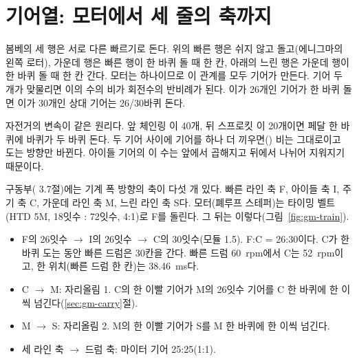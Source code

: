 \section{기어열: 모터에서 세 줄의 축까지}\label{sec:gm-train}

\Why 봄베의 세 행은 서로 다른 빠르기로 돈다. 위의 빠른 행은 쉬지 않고 돌고(에니그마의 왼쪽 로터), 가운데 행은 빠른
행이 한 바퀴 돌 때 한 칸, 아래의 느린 행은 가운데 행이 한 바퀴 돌 때 한 칸 간다. 모터는 하나이므로 이 관계를
모두 기어가 만든다. 기어 두 개가 맞물리면 이의 수의 비가 회전수의 반비례가 된다. 이가 26개인 기어가 한 바퀴 돌면
이가 30개인 상대 기어는 26/30바퀴 돈다.

\General 자전거의 변속이 같은 원리다. 앞 체인링 이 40개, 뒤 스프로킷 이 20개이면 페달 한 바퀴에 바퀴가 두 바퀴
돈다. 두 기어 사이에 기어를 하나 더 끼우면() 비는 그대로이고 도는 방향만 바뀐다.
아이들 기어의 이 수는 앞에서 곱해지고 뒤에서 나뉘어 지워지기 때문이다.

\Ours 구동부( 3.7절)에는 기계 폭 방향의 축이 다섯 개 있다. 빠른 라인 축 F, 아이들 축 I, 주기 축 C,
가운데 라인 축 M, 느린 라인 축 S다. 모터(폐루프 스테퍼)는 타이밍 벨트(HTD 5M, 18잇수 : 72잇수, 4:1)로 F를 돌린다.
그 뒤는 이렇다(그림~\ref{fig:gm-train}).

\begin{itemize}
\item F의 26잇수 $\to$ I의 26잇수 $\to$ C의 30잇수(모듈 1.5). F:C = 26:30이다. C가 한 바퀴 도는 동안 빠른 드럼은
30칸을 간다. 빠른 드럼 60~rpm에서 C는 52~rpm이고, 한 위치(빠른 드럼 한 칸)는 38.46~ms다.
\item C $\to$ M: 자리올림 1. C의 한 이빨 기어가 M의 26잇수 기어를 C 한 바퀴에 한 이씩 넘긴다(\ref{sec:gm-carry}절).
\item M $\to$ S: 자리올림 2. M의 한 이빨 기어가 S를 M 한 바퀴에 한 이씩 넘긴다.
\item 세 라인 축 $\to$ 드럼 축: 마이터 기어 25:25(1:1).
\end{itemize}

